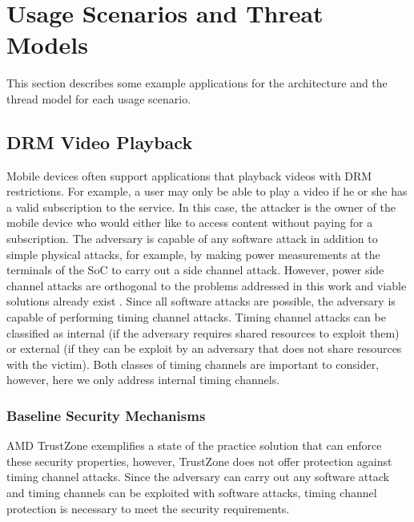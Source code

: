 \section{Usage Scenarios and Threat Models}

    This section describes some example applications for the architecture and 
    the thread model for each usage scenario.

    \subsection{DRM Video Playback}
    Mobile devices often support applications that playback videos with
    DRM restrictions. For example, a user may only be able to play a video if 
    he or she has a valid subscription to the service. In this case, the 
    attacker is the owner of the mobile device who would either like to access 
    content without paying for a subscription. The adversary is capable of any 
    software attack in addition to simple physical attacks, for example, by 
    making power measurements at the terminals of the SoC to carry out a side 
    channel attack. However, power side channel attacks are orthogonal to the 
    problems addressed in this work and viable solutions already exist 
    \cite{needed}. Since all software attacks are possible, the adversary is 
    capable of performing timing channel attacks. Timing channel attacks can be 
    classified as internal (if the adversary requires shared resources to 
    exploit them) or external (if they can be exploit by an adversary that does 
    not share resources with the victim). Both classes of timing channels are 
    important to consider, however, here we only address internal timing 
    channels.

    \subsubsection{Baseline Security Mechanisms}
    AMD TrustZone \cite{trustzone} exemplifies a state of the practice solution 
    that can enforce these security properties, however, TrustZone does not 
    offer protection against timing channel attacks. Since the adversary can 
    carry out any software attack and timing channels can be exploited with 
    software attacks, timing channel protection is necessary to meet the 
    security requirements. 
    
